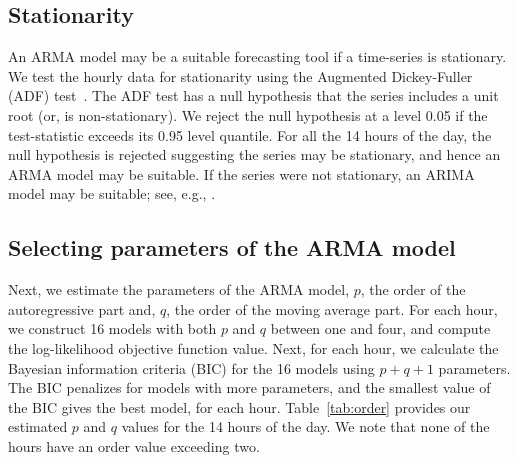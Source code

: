 \documentclass[11pt]{article} %
\begin{document}
\subsection{Stationarity} \label{sec:stationarity}
An ARMA model may be a suitable forecasting tool if a time-series is 
stationary. We test 
the hourly data for stationarity using the Augmented 
Dickey-Fuller (ADF) test~\cite{dickey1979distribution}. The ADF test has a null 
hypothesis that the series includes a unit root (or, is non-stationary). We 
reject the null hypothesis at a level 0.05 if the test-statistic exceeds its 
0.95 level quantile. For all the 14 hours of the day, the null hypothesis is 
rejected suggesting the series may be stationary, and hence an ARMA model may 
be suitable. If the series were not stationary, an ARIMA model may be suitable; 
see, e.g., \cite{contreras2003arima}.

\subsection{Selecting parameters of the ARMA model} 
Next, we estimate the parameters of the ARMA model, $p$, the order of the 
autoregressive part and, $q$, the order of the moving average part. For each 
hour, we construct 16 models with both $p$ and $q$ between one and four, and 
compute 
the log-likelihood objective function value. Next, for each hour, we calculate 
the Bayesian information criteria (BIC) for the 16 models using $p + q + 1$ 
parameters.  The BIC penalizes for models with more parameters, and the 
smallest value of the BIC gives the best model, for each 
hour. Table~\ref{tab:order} provides our estimated $p$ and $q$  values for 
the 14 hours of the day. We note that none of the hours have an order value 
exceeding two.

\begin{table}[!htb]
	\centering
	\caption{Estimated $p$ and $q$ values for ARMA($p,q$) models for 14 hours of 
		the day}
	\label{tab:order}
\end{table}
\end{document}
